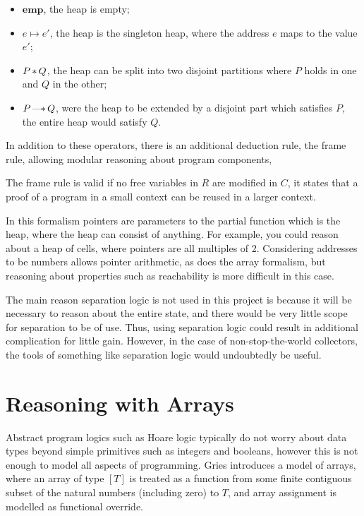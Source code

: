 \begin{itemize}
  \item $\mathbf{emp}$, the heap is empty;

  \item $e \mapsto e'$, the heap is the singleton heap, where the
    address $e$ maps to the value $e'$;

  \item $P \sepc Q$, the heap can be split into two disjoint partitions
    where $P$ holds in one and $Q$ in the other;

  \item $P \sepi Q$, were the heap to be extended by a disjoint part
    which satisfies $P$, the entire heap would satisfy $Q$.
\end{itemize}

In addition to these operators, there is an additional deduction rule,
the frame rule, allowing modular reasoning about program components,

\begin{prooftree}
\end{prooftree}

The frame rule is valid if no free variables in $R$ are modified in
$C$, it states that a proof of a program in a small context can be
reused in a larger context.

In this formalism pointers are parameters to the partial function
which is the heap, where the heap can consist of anything. For
example, you could reason about a heap of cells, where pointers are
all multiples of 2. Considering addresses to be numbers allows pointer
arithmetic, as does the array formalism, but reasoning about
properties such as reachability is more difficult in this case.

The main reason separation logic is not used in this project is
because it will be necessary to reason about the entire state, and
there would be very little scope for separation to be of use. Thus,
using separation logic could result in additional complication for
little gain. However, in the case of non-stop-the-world collectors,
the tools of something like separation logic would undoubtedly be
useful.

\section{Reasoning with Arrays}
\label{sec:heap-arrays}

Abstract program logics such as Hoare logic typically do not worry
about data types beyond simple primitives such as integers and
booleans, however this is not enough to model all aspects of
programming. Gries introduces a model of arrays\cite{Gries87}, where
an array of type $[T]$ is treated as a function from some finite
contiguous subset of the natural numbers (including zero) to $T$, and
array assignment is modelled as functional override.

